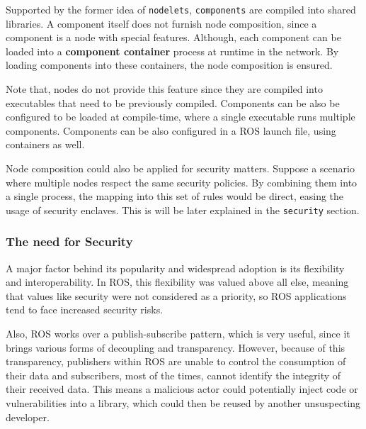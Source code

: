 Supported by the former idea of \texttt{nodelets}, \texttt{components} are compiled into shared libraries. A component itself does not furnish node composition, since a component is a node with special features. Although,  each component can be loaded into a \textbf{component container} process at runtime in the network. By loading components into these containers, the node composition is ensured. 
 
Note that, nodes do not provide this feature since they are compiled into executables that need to be previously compiled. Components can be also be configured to be loaded at compile-time, where a single executable runs multiple components. Components can be also configured in a ROS launch file, using containers as well.
 
Node composition could also be applied for security matters. Suppose a scenario where multiple nodes respect the same security policies. By combining them into a single process, the mapping into this set of rules would be direct, easing the usage of security enclaves. %
This is will be later explained in the \texttt{security} section.
               

\subsubsection{The need for Security}
        
A major factor behind its popularity and widespread adoption is its flexibility and interoperability. In ROS, this flexibility was valued above all else, meaning that values like security were not considered as a priority, so ROS applications tend to face increased security risks. 
            
Also, ROS works over a publish-subscribe pattern, which is very useful, since it brings various forms of decoupling and transparency. However, because of this transparency, publishers within ROS are unable to control the consumption of their data and subscribers, most of the times, cannot identify the integrity of their received data. %
This means a malicious actor could potentially inject code or vulnerabilities into a library, which could then be reused by another unsuspecting developer.

